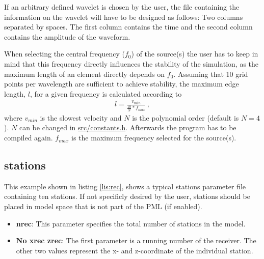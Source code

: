     	If an arbitrary defined wavelet is chosen by the user, the file containing the information on the wavelet will have to be designed as follows: Two columns separated by spaces. The first column contains the time and the second column contains the amplitude of the waveform.
 
 \medskip
    	When selecting the central frequency ($f_0$) of the source(s) the user has to keep in mind that this frequency directly influences the stability of the simulation, as the maximum length of an element directly depends on $f_0$. Assuming that 10 grid points per wavelength are sufficient to achieve stability, the maximum edge length, $l$, for a given frequency is calculated according to
    	\begin{align*}
    		l = \frac{v_{min}}{\frac{10}{N} * f_{max}}\,,
		\end{align*}
		where $v_{min}$ is the slowest velocity and $N$ is the polynomial order (default is $N = 4$). $N$ can be changed in \url{src/constants.h}. Afterwards the program has to be compiled again. $f_{max}$ is the maximum frequency selected for the source(s).  	   
    \subsection{stations}
    \label{subsec:stations}
    	This example shown in listing \ref{lis:rec}, shows a typical stations parameter file containing ten stations. If not specificly desired by the user, stations should be placed in model space that is not part of the PML (if enabled).
     
    
			\begin{itemize}
				\item \textbf{nrec}: This parameter specifies the total number of stations in the model.
				\item \textbf{No xrec zrec}: The first parameter is a running number of the receiver. The other two values represent the x- and z-coordinate of the individual station.
			\end{itemize}			    		 		
